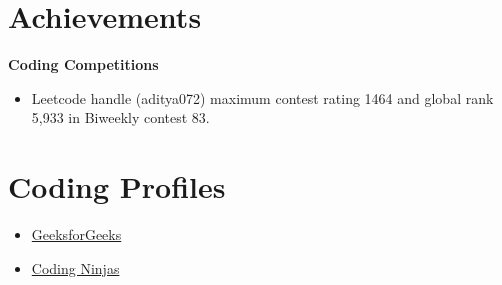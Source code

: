\documentclass[letterpaper,11pt]{article}
\newcommand{\resumeItem}[1]{
  \item\small{
    {#1 \vspace{-2pt}}
  }
}
\newcommand{\resumeItemListStart}{\begin{itemize}}
\newcommand{\resumeItemListEnd}{\end{itemize}\vspace{-5pt}}
\begin{document}
\section{Achievements}
 {\textbf{Coding Competitions}} \vspace{-5pt}
\resumeItemListStart
\resumeItem{Leetcode handle (aditya072) maximum contest rating 1464 and global rank 5,933 in Biweekly contest 83.}
\resumeItemListEnd
\vspace{-10pt}

\section{Coding Profiles}
\resumeItemListStart
\resumeItem{\href{https://auth.geeksforgeeks.org/user/aditya072/}{\color{blue}GeeksforGeeks}}
\resumeItem{\href{https://www.codingninjas.com/studio/profile/aditya072}{\color{blue}Coding Ninjas}}
\resumeItemListEnd
\end{document}
